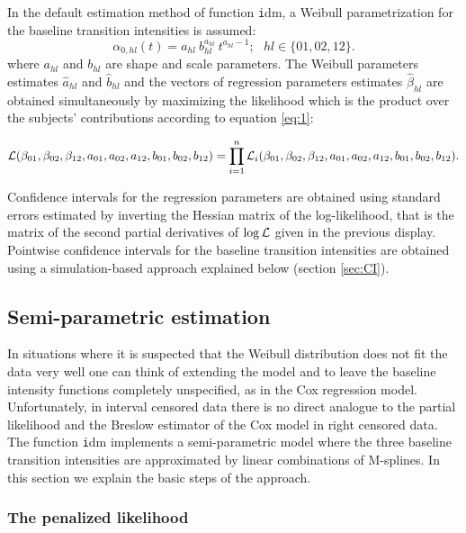 \documentclass{article}
\newcommand{\code}[1]{{\texttt #1}}
\begin{document}
In the default estimation method of function \code{idm}, a Weibull
parametrization for the baseline transition intensities is assumed: $$
\alpha_{0,hl}(t)= a_{hl} ~ b_{hl}^{a_{hl}} ~ t^{a_{hl}-1}; ~~~ hl \in
\{01,02,12\}.$$ where $a_{hl}$ and $b_{hl}$ are shape and scale
parameters.  The Weibull parameters estimates $\hat{a}_{hl}$ and $\hat{b}_{hl}$ and the
vectors of regression parameters estimates $\hat \beta_{hl}$ are obtained
simultaneously by maximizing the likelihood which is the product over the
subjects' contributions according to equation \ref{eq:1}:

$${\cal{L}}(\beta_{01},\beta_{02},\beta_{12},a_{01},a_{02},a_{12},b_{01},b_{02},b_{12})
= \prod_{i=1}^n{\cal{L}}_i(\beta_{01},\beta_{02},\beta_{12},a_{01},a_{02},a_{12},b_{01},b_{02},b_{12}).$$

Confidence intervals for the regression parameters are obtained using
standard errors estimated by inverting the Hessian matrix of the
log-likelihood, that is the matrix of the second partial derivatives
of $\log{\cal L}$ given in the previous display. Pointwise confidence intervals for
the baseline transition intensities are obtained using a
simulation-based approach explained below (section \ref{sec:CI}).
\subsection{Semi-parametric estimation}
\label{sec-3-2}
\label{sec:semi-para}

In situations where it is suspected that the Weibull distribution does
not fit the data very well one can think of extending the model and to
leave the baseline intensity functions completely unspecified, as in
the Cox regression model. Unfortunately, in interval censored data
there is no direct analogue to the partial likelihood and the Breslow
estimator of the Cox model in right censored data. 
The function \code{idm} implements a
semi-parametric model where the three baseline transition intensities
are approximated by linear combinations of M-splines. In this section
we explain the basic steps of the approach.

\subsubsection{The penalized likelihood}
\label{sec-3-2-1}
\end{document}
